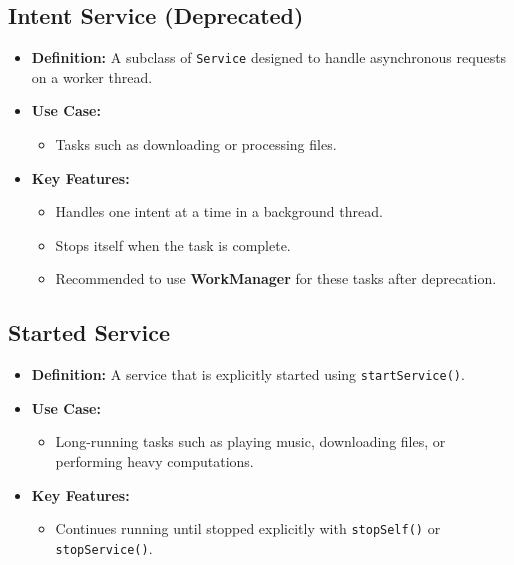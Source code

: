 \documentclass[12pt]{article}
\begin{document}
\begin{itemize}
    \subsection{Intent Service (Deprecated)}
    \begin{itemize}[leftmargin=*]
        \item \textbf{Definition:} A subclass of \texttt{Service} designed to handle asynchronous requests on a worker thread.
        \item \textbf{Use Case:}
        \begin{itemize}
            \item Tasks such as downloading or processing files.
        \end{itemize}
        \item \textbf{Key Features:}
        \begin{itemize}
            \item Handles one intent at a time in a background thread.
            \item Stops itself when the task is complete.
            \item Recommended to use \textbf{WorkManager} for these tasks after deprecation.
        \end{itemize}
    \end{itemize}
    
    \subsection{ Started Service}
    \begin{itemize}[leftmargin=*]
        \item \textbf{Definition:} A service that is explicitly started using \texttt{startService()}.
        \item \textbf{Use Case:}
        \begin{itemize}
            \item Long-running tasks such as playing music, downloading files, or performing heavy computations.
        \end{itemize}
        \item \textbf{Key Features:}
        \begin{itemize}
            \item Continues running until stopped explicitly with \texttt{stopSelf()} or \texttt{stopService()}.
        \end{itemize}
    \end{itemize}
    

\end{itemize}
\end{document}
